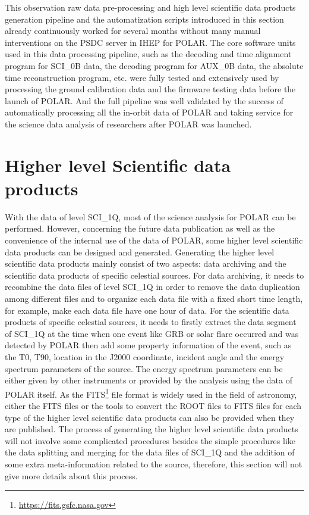 \documentclass{raa}
\begin{document}
This observation raw data pre-processing and high level scientific data products generation pipeline and the automatization scripts introduced in this section already continuously worked for several months without many manual interventions on the PSDC server in IHEP for POLAR. The core software units used in this data processing pipeline, such as the decoding and time alignment program for SCI\_0B data, the decoding program for AUX\_0B data, the absolute time reconstruction program, etc. were fully tested and extensively used by processing the ground calibration data and the firmware testing data before the launch of POLAR. And the full pipeline was well validated by the success of automatically processing all the in-orbit data of POLAR and taking service for the science data analysis of researchers after POLAR was launched.

\section{Higher level Scientific data products}

With the data of level SCI\_1Q, most of the science analysis for POLAR can be performed. However, concerning the future data publication as well as the convenience of the internal use of the data of POLAR, some higher level scientific data products can be designed and generated. Generating the higher level scientific data products mainly consist of two aspects: data archiving and the scientific data products of specific celestial sources. For data archiving, it needs to recombine the data files of level SCI\_1Q in order to remove the data duplication among different files and to organize each data file with a fixed short time length, for example, make each data file have one hour of data. For the scientific data products of specific celestial sources, it needs to firstly extract the data segment of SCI\_1Q at the time when one event like GRB or solar flare occurred and was detected by POLAR then add some property information of the event, such as the T0, T90, location in the J2000 coordinate, incident angle and the energy spectrum parameters of the source. The energy spectrum parameters can be either given by other instruments or provided by the analysis using the data of POLAR itself. As the FITS\footnote{\url{https://fits.gsfc.nasa.gov}} file format is widely used in the field of astronomy, either the FITS files or the tools to convert the ROOT files to FITS files for each type of the higher level scientific data products can also be provided when they are published. The process of generating the higher level scientific data products will not involve some complicated procedures besides the simple procedures like the data splitting and merging for the data files of SCI\_1Q and the addition of some extra meta-information related to the source, therefore, this section will not give more details about this process.
\end{document}
